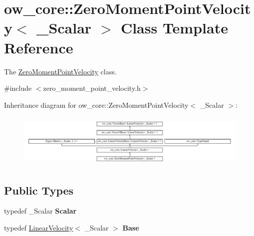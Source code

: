 \hypertarget{classow__core_1_1ZeroMomentPointVelocity}{}\section{ow\+\_\+core\+:\+:Zero\+Moment\+Point\+Velocity$<$ \+\_\+\+Scalar $>$ Class Template Reference}
\label{classow__core_1_1ZeroMomentPointVelocity}


The \hyperlink{classow__core_1_1ZeroMomentPointVelocity}{Zero\+Moment\+Point\+Velocity} class.  




{\ttfamily \#include $<$zero\+\_\+moment\+\_\+point\+\_\+velocity.\+h$>$}

Inheritance diagram for ow\+\_\+core\+:\+:Zero\+Moment\+Point\+Velocity$<$ \+\_\+\+Scalar $>$\+:\begin{figure}[H]
\begin{center}
\leavevmode
\includegraphics[height=2.599814cm]{d5/d60/classow__core_1_1ZeroMomentPointVelocity}
\end{center}
\end{figure}
\subsection*{Public Types}
\begin{DoxyCompactItemize}
\item 
typedef \+\_\+\+Scalar {\bfseries Scalar}\hypertarget{classow__core_1_1ZeroMomentPointVelocity_a8c3af8c1e459fa894f87ad3ef4d3411c}{}\label{classow__core_1_1ZeroMomentPointVelocity_a8c3af8c1e459fa894f87ad3ef4d3411c}

\item 
typedef \hyperlink{classow__core_1_1LinearVelocity}{Linear\+Velocity}$<$ \+\_\+\+Scalar $>$ {\bfseries Base}\hypertarget{classow__core_1_1ZeroMomentPointVelocity_a0bcca6c3a0e7e87114fd8488f0dd934b}{}\label{classow__core_1_1ZeroMomentPointVelocity_a0bcca6c3a0e7e87114fd8488f0dd934b}

\end{DoxyCompactItemize}
